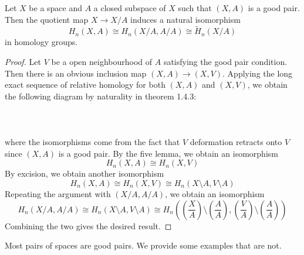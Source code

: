 \documentclass[a4paper]{article}
\begin{document}
\begin{prp}{}{} Let $X$ be a space and $A$ a closed subspace of $X$ such that $(X,A)$ is a good pair. Then the quotient map $X\to X/A$ induces a natural isomorphism $$H_n(X,A)\cong H_n(X/A,A/A)\cong\widetilde{H}_n(X/A)$$ in homology groups. \tcbline
\begin{proof}
Let $V$ be a open neighbourhood of $A$ satisfying the good pair condition. Then there is an obvious inclusion map $(X,A)\to(X,V)$. Applying the long exact sequence of relative homology for both $(X,A)$ and $(X,V)$, we obtain the following diagram by naturality in theorem 1.4.3: \\~\\
\\~\\
where the isomorphisms come from the fact that $V$ deformation retracts onto $V$ since $(X,A)$ is a good pair. By the five lemma, we obtain an isomorphism $$H_n(X,A)\cong H_n(X,V)$$ By excision, we obtain another isomorphism $$H_n(X,A)\cong H_n(X,V)\cong H_n(X\setminus A,V\setminus A)$$ Repeating the argument with $(X/A,A/A)$, we obtain an isomorphism $$H_n(X/A,A/A)\cong H_n(X\setminus A,V\setminus A)\cong H_n\left(\left(\frac{X}{A}\right)\setminus\left(\frac{A}{A}\right),\left(\frac{V}{A}\right)\setminus\left(\frac{A}{A}\right)\right)$$ Combining the two gives the desired result. 
\end{proof}
\end{prp}

Most pairs of spaces are good pairs. We provide some examples that are not. \\~\\
\end{document}
